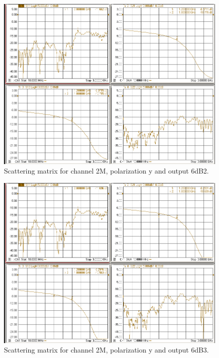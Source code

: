 \documentclass[12pt,a4paper,oneside]{article}
\begin{document}
\begin{figure}[H]
\centering
\includegraphics[width=0.9\linewidth]{VNA_results/2My_6dB2.png}
\caption{Scattering matrix for channel 2M, polarization y and output 6dB2.}
\label{fig:2My_6dB2}
\end{figure}


\begin{figure}[H]
\centering
\includegraphics[width=0.9\linewidth]{VNA_results/2My_6dB3.png}
\caption{Scattering matrix for channel 2M, polarization y and output 6dB3.}
\label{fig:2My_6dB3}
\end{figure}
\end{document}
